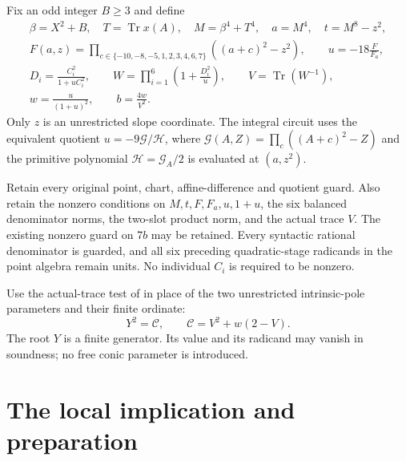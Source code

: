 \documentclass[11pt,a4paper]{article}
\DeclareMathOperator{\Tr}{Tr}\DeclareMathOperator{\TC}{TC}
\begin{document}
Fix an odd integer $B\ge3$ and define
\begin{equation}\label{eq:source}
\begin{gathered}
 \beta=X^2+B,\quad T=\Tr x(A),\quad M=\beta^4+T^4,\quad
 a=M^4,\quad t=M^8-z^2,\\
 F(a,z)=\prod_{c\in\{-10,-8,-5,1,2,3,4,6,7\}}
                  ((a+c)^2-z^2),\qquad u=-18\frac{F}{F_a},\\
 D_i=\frac{C_i^2}{1+uC_i^2},\qquad
 W=\prod_{i=1}^6\left(1+\frac{D_i^2}{u}\right),\qquad
 V=\Tr(W^{-1}),\\
 w=\frac{u}{(1+u)^2},\qquad b=\frac{4w}{V^2}.
\end{gathered}
\end{equation}
Only $z$ is an unrestricted slope coordinate. The integral circuit
uses the equivalent quotient $u=-9\mathcal G/\mathcal H$, where
$\mathcal G(A,Z)=\prod_c((A+c)^2-Z)$ and the primitive polynomial
$\mathcal H=\mathcal G_A/2$ is evaluated at $(a,z^2)$.

Retain every original point, chart, affine-difference and quotient
guard. Also retain the nonzero conditions on $M,t,F,F_a,u,1+u$,
the six balanced denominator norms, the two-slot product norm,
and the actual trace $V$. The existing nonzero guard on $7b$ may
be retained. Every syntactic rational denominator is guarded,
and all six preceding quadratic-stage radicands in the point algebra
remain units. No individual $C_i$ is required to be nonzero.

Use the actual-trace test of \cite{Conic} in place of the two
unrestricted intrinsic-pole parameters and their finite ordinate:
\begin{equation}\label{eq:conic}
                  Y^2=\mathcal C,\qquad
                  \mathcal C=V^2+w(2-V).
\end{equation}
The root $Y$ is a finite generator. Its value and its radicand may
vanish in soundness; no free conic parameter is introduced.

\section{The local implication and preparation}
\end{document}
